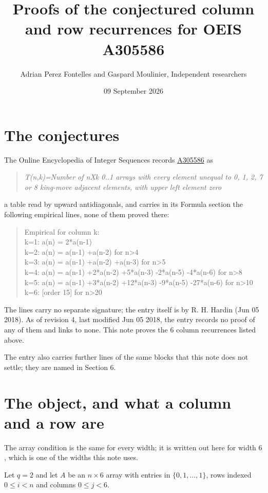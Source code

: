 \documentclass[11pt]{article}
\title{Proofs of the conjectured column and row recurrences for OEIS A305586}
\author{Adrian Perez Fontelles and Gaspard Moulinier, Independent researchers}
\date{09 September 2026}
\theoremstyle{definition}
\begin{document}
\maketitle
\section{The conjectures}

The Online Encyclopedia of Integer Sequences records \href{https://oeis.org/A305586}{A305586} as

\begin{quote}\itshape T(n,k)=Number of nXk 0..1 arrays with every element unequal to 0, 1, 2, 7 or 8 king-move adjacent elements, with upper left element zero\end{quote}

a table read by upward antidiagonals, and carries in its Formula section the following empirical lines, none of them proved there:

\begin{quote}\ttfamily Empirical for column k:\\
k=1: a(n) = 2*a(n-1)\\k=2: a(n) = a(n-1) +a(n-2) for n>4\\k=3: a(n) = a(n-1) +a(n-2) +a(n-3) for n>5\\k=4: a(n) = a(n-1) +2*a(n-2) +5*a(n-3) -2*a(n-5) -4*a(n-6) for n>8\\k=5: a(n) = a(n-1) +3*a(n-2) +12*a(n-3) -9*a(n-5) -27*a(n-6) for n>10\\k=6: [order 15] for n>20\end{quote}

The lines carry no separate signature; the entry itself is by R. H. Hardin (Jun 05 2018). As of revision 4, last modified Jun 05 2018, the entry records no proof of any of them and links to none. This note proves the 6 column recurrences listed above.

The entry also carries further lines of the same blocks that this note does not settle; they are named in Section 6.

\section{The object, and what a column and a row are}

The array condition is the same for every width; it is written out here for width $6$, which is one of the widths this note uses.

Let $q = 2$ and let $A$ be an $n \times 6$ array with entries in $\{0,1,\dots,1\}$, rows indexed $0 \le i < n$ and columns $0 \le j < 6$.
\end{document}

